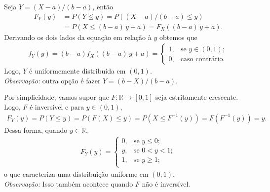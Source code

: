 \begin{questions}

\setcounter{question}{26}
\begin{solution}
Seja $Y = (X-a)/(b-a)$, então
\begin{align*}
	F_Y(y) &= P(Y\le y) = P((X-a)/(b-a) \le y)\\
    	&= P(X \le (b-a)\,y+a) = F_X((b-a)\,y+a).
\end{align*}
Derivando os dois lados da equação em relação à $y$ obtemos que
\begin{align*}
	f_Y(y) =  (b-a)f_X((b-a)\,y+a) =
    \begin{cases}
    	1, &\text{se }y\in(0,1);\\
        0, &\text{caso contrário.}
    \end{cases}
\end{align*}
Logo, $Y$ é uniformemente distribuída em $(0,1)$.\\[1mm]
\textit{Observação:} outra opção é fazer $Y = (b-X)/(b-a)$.
\end{solution}

\setcounter{question}{28}
\begin{solution}
	Por simplicidade, vamos supor que $F: \mathbb{R} \to [0,1]$ seja estritamente crescente. Logo, $F$ é inversível e para $y \in (0,1)$,
	\begin{align*}
		F_Y(y) = P(Y\le y) = P(F(X)\le y) = P(X \le F^{-1}(y)) = F(F^{-1}(y)) = y.
	\end{align*}
    Dessa forma, quando $y \in \mathbb{R}$,
    \begin{align*}
    	F_Y(y) =
        \begin{cases}
    	0, &\text{se }y \le 0;\\
        y, &\text{se }0 < y < 1;\\
        1, &\text{se }y \ge 1;\\
    	\end{cases}
    \end{align*}
    o que caracteriza uma distribuição uniforme em $(0,1)$.\\[1mm]
    \textit{Observação:} Isso também acontece quando $F$ não é inversível.
\end{solution}


\end{questions}
